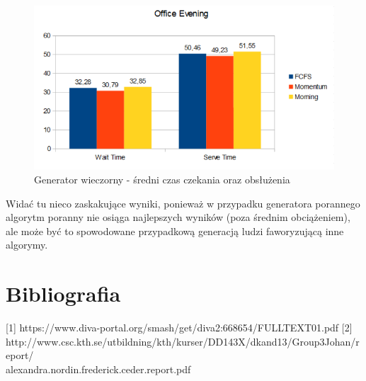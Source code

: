\documentclass[a4paper,11pt]{article}
\begin{document}
\begin{figure}[H]
    \centering
    \caption{Generator wieczorny - średni czas czekania oraz obsłużenia}
    \includegraphics[width=\textwidth]{oe_time.png}
\end{figure}

\noindent
Widać tu nieco zaskakujące wyniki, ponieważ w przypadku generatora porannego algorytm poranny nie osiąga najlepszych wyników (poza średnim obciążeniem), ale może być to spowodowane przypadkową generacją ludzi faworyzującą inne algorymy.

\section{Bibliografia}
[1] https://www.diva-portal.org/smash/get/diva2:668654/FULLTEXT01.pdf
[2] http://www.csc.kth.se/utbildning/kth/kurser/DD143X/dkand13/Group3Johan/report/\\
\indent alexandra.nordin.frederick.ceder.report.pdf
\end{document}
